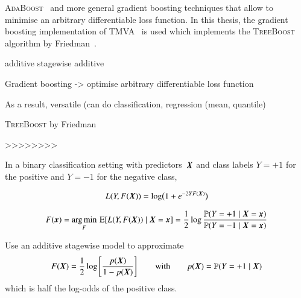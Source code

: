 
\textsc{AdaBoost}~\cite{freund_shapire:adaboost,freund_shapire:adaboost2} and
more general gradient boosting techniques that allow to minimise an arbitrary
differentiable loss function.  In this thesis, the gradient boosting
implementation of TMVA~\cite{TMVA} is used which implements the
\textsc{TreeBoost} algorithm by Friedman~\cite{Friedman:2001wbq}.


additive stagewise additive

Gradient boosting -> optimise arbitrary differentiable loss function

As a result, versatile (can do classification, regression (mean, quantile)



\textsc{TreeBoost} by Friedman~\cite{Friedman:2000,Friedman:2001wbq}




>>>>>>>>





In a binary classification setting with predictors~$\myvec{X}$ and class labels
$Y = +1$ for the positive and $Y = -1$ for the negative class,



\begin{align*}
  L(Y, F(\myvec{X})) = \log\bigl( 1 + e^{-2 Y F(\myvec{X})} \bigr)
\end{align*}






\begin{align*}
  F(\myvec{x})
  = \argmin_F \, \expect[ L(Y, F(\myvec{X})) \mid \myvec{X} = \myvec{x} ]
  = \frac{1}{2} \log\frac{
  \mathbb{P}(Y = +1 \mid \myvec{X} = \myvec{x})
  }{
  \mathbb{P}(Y = -1 \mid \myvec{X} = \myvec{x})
  }
\end{align*}





Use an additive stagewise model to approximate
\begin{align*}
  F(\myvec{X}) = \frac{1}{2} \log\left[ \frac{p(\myvec{X})}{1 - p(\myvec{X})} \right] \qquad \text{with} \qquad p(\myvec{X}) = \mathbb{P}(Y = +1 \mid \myvec{X})
\end{align*}
which is half the log-odds of the positive class.



